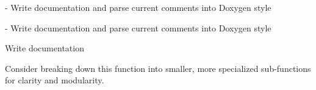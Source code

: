 \begin{DoxyRefList}
%
-\/ Write documentation and parse current comments into Doxygen style  
\item[Member \mbox{\hyperlink{classm_d_o_m_harness_aa192aa85786a58ad121567fbb7a78f06}{m\+DOMHarness\+::m\+DOMHarness}} (\mbox{\hyperlink{classm_d_o_m}{m\+DOM}} $\ast$p\+MDOM, \mbox{\hyperlink{class_input_data_manager}{Input\+Data\+Manager}} $\ast$p\+Data)]\label{todo__todo000008}%
%
-\/ Write documentation and parse current comments into Doxygen style  
\item[File \mbox{\hyperlink{_o_m_sim_d_e_g_g_harness_8hh}{OMSim\+DEGGHarness.hh}} ]\label{todo__todo000003}%
%
Write documentation


\item[Member \mbox{\hyperlink{class_o_m_sim_i_b_d_a50ac39b481be2a879c73f94e201ef6da}{OMSim\+IBD\+::Generate\+Primaries}} (G4\+Event $\ast$an\+Event)]\label{todo__todo000009}%
%
Consider breaking down this function into smaller, more specialized sub-\/functions for clarity and modularity. 


\end{DoxyRefList}
